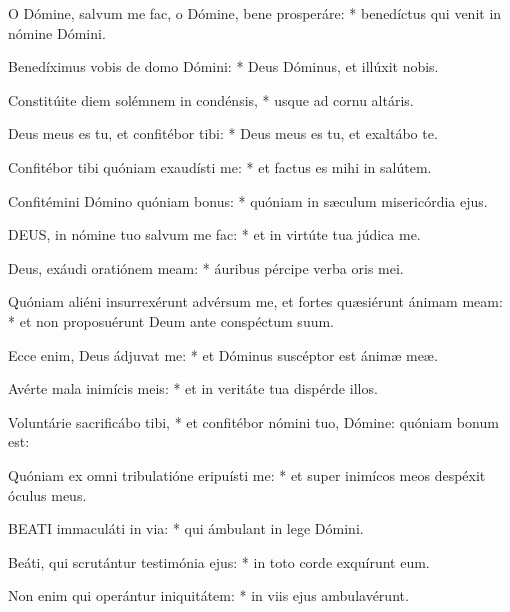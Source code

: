 O Dómine, salvum me fac, o Dómine, bene prosperáre: * benedíctus qui venit in nómine Dómini.

Benedíximus vobis de domo Dómini: * Deus Dóminus, et illúxit nobis.

Constitúite diem solémnem in condénsis, * usque ad cornu altáris.

Deus meus es tu, et confitébor tibi: * Deus meus es tu, et exaltábo te.

Confitébor tibi quóniam exaudísti me: * et factus es mihi in salútem.

Confitémini Dómino quóniam bonus: * quóniam in sæculum misericórdia ejus.



\lettrine[lines=2]{D}{EUS}, in nómine tuo salvum me fac: * et in virtúte tua júdica me.

Deus, exáudi oratiónem meam: * áuribus pércipe verba oris mei.

Quóniam aliéni insurrexérunt advérsum me, et fortes quæsiérunt ánimam meam: * et non proposuérunt Deum ante conspéctum suum.

Ecce enim, Deus ádjuvat me: * et Dóminus suscéptor est ánimæ meæ.

Avérte mala inimícis meis: * et in veritáte tua dispérde illos.

Voluntárie sacrificábo tibi, * et confitébor nómini tuo, Dómine: quóniam bonum est:

Quóniam ex omni tribulatióne eripuísti me: * et super inimícos meos despéxit óculus meus.


\lettrine[lines=2]{B}{EATI} immaculáti in via: * qui ámbulant in lege Dómini.

Beáti, qui scrutántur testimónia ejus: * in toto corde exquírunt eum.

Non enim qui operántur iniquitátem: * in viis ejus ambulavérunt.

